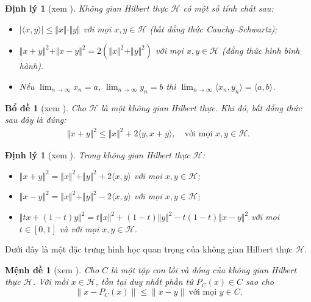 \documentclass[14pt, oneside,A4paper]{book}
\theoremstyle{plain}
\newtheorem{bd}[theorem]{Bổ đề}
\newtheorem{md}[theorem]{Mệnh đề}
\newtheorem{dl}[theorem]{Định lý}
\begin{document}
\begin{dl}[xem \cite{Tuy}]  Không gian Hilbert thực $\mathcal H$ có một số tính chất sau:
	\begin{itemize}
		\item[$(i)$] $\vert \langle x,y\rangle \vert \leq \Vert x\Vert\cdot\Vert y \Vert $ với mọi $x,y\in \mathcal H$ (bất đẳng thức Cauchy--Schwartz);
		\item[$(ii)$] $\Vert x+y \Vert^{2}+\Vert x-y \Vert^{2} = 2(\Vert x \Vert^{2} + \Vert y \Vert^{2})$ với mọi $x,y\in \mathcal H$ (đẳng thức hình bình hành).
		\item[$(iii)$] Nếu $\lim_{n\to \infty} {x_{n}}=a$, $\lim_{n\to \infty} {y_{n}}=b$ thì $\lim_{n\to \infty} \langle x_{n},y_{n} \rangle = \langle a,b\rangle $.
	\end{itemize}
\end{dl}

\begin{bd}[xem \cite{Tuy}]\label{bd2.2.1}
	Cho $\mathcal H$ là một không gian Hilbert thực. Khi đó, bất đẳng thức sau đây là đúng:
	\begin{align*}
	\Vert x+y \Vert^{2}\leq \Vert x \Vert^{2}+2\langle y,x+y \rangle, \quad \text{với mọi $x,y\in \mathcal H$}.
	\end{align*}
\end{bd}

\begin{dl}[xem \cite{Tuy}] Trong không gian Hilbert thực $\mathcal H$:
	\begin{itemize}
		\item[$(i)$] $\Vert x+y\Vert^2 = \Vert x\Vert^2 +\Vert y\Vert^2 + 2 \langle x,y\rangle$ với mọi $x,y\in \mathcal H$;
		\item[$(ii)$] $\Vert x-y\Vert^2 = \Vert x\Vert^2 +\Vert y\Vert^2 - 2 \langle x,y\rangle$ với mọi $x,y\in \mathcal H$;
		\item[$(iii)$] $\Vert  t x+(1-t) y\Vert^2 =t \Vert x\Vert^2 + (1-t) \Vert y\Vert^2 -t(1-t)  \Vert x -y\Vert^2$ với mọi $t \in [0,1]$ và với mọi $x,y\in \mathcal H$.
	\end{itemize}
\end{dl}

Dưới đây là một đặc trưng hình học quan trọng của không gian Hilbert thực $\mathcal H$.

\begin{md}[xem \cite{AS}] \label{mdPC}
Cho $C$ là một tập con lồi và đóng của không gian Hilbert thực $\mathcal H$. Với mỗi $x\in \mathcal H$, tồn tại duy nhất phần tử $P_C(x)\in C$ sao cho
$$\|x-P_C(x)\|\leq\|x-y\|\ \text{với mọi }y\in C.$$
\end{md} 
\end{document}
